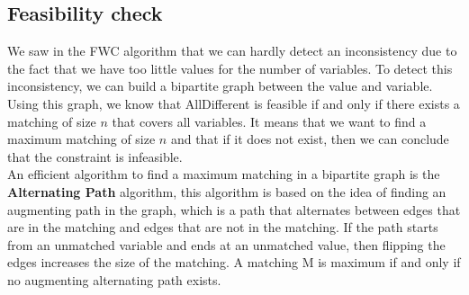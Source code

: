 \documentclass[12pt, openany]{report}
\theoremstyle{definition}
\begin{document}
\subsection{Feasibility check}
We saw in the FWC algorithm that we can hardly detect an inconsistency due to the fact that we have too little values for the number of variables. To detect this inconsistency, we can build a bipartite graph between the value and variable. Using this graph, we know that AllDifferent is feasible if and only if there exists a matching of size $n$ that covers all variables. It means that we want to find a maximum matching of size $n$ and that if it does not exist, then we can conclude that the constraint is infeasible.\\
An efficient algorithm to find a maximum matching in a bipartite graph is the \textbf{Alternating Path} algorithm, this algorithm is based on the idea of finding an augmenting path in the graph, which is a path that alternates between edges that are in the matching and edges that are not in the matching. If the path starts from an unmatched variable and ends at an unmatched value, then flipping the edges increases the size of the matching. A matching M is maximum if and only if no augmenting alternating path exists.
\end{document}
